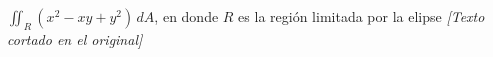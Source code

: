\item $\iint_R (x^2 - xy + y^2) \, dA$, en donde $R$ es la región limitada por la elipse \textit{[Texto cortado en el original]}
